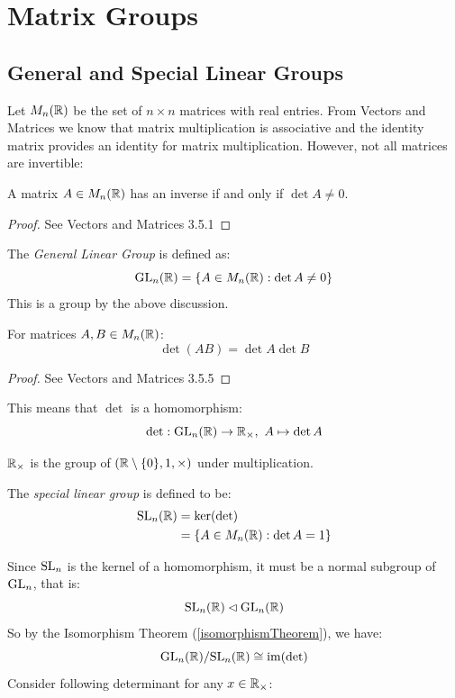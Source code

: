 \documentclass[../main.tex]{subfiles}
\begin{document}
\chapter{Matrix Groups}
\section{General and Special Linear Groups}
Let $M_n(\mathbb{R})$ be the set of $n \times n$ matrices with real entries.
From Vectors and Matrices we know that matrix multiplication is associative and the identity matrix provides an identity for matrix multiplication.
However, not all matrices are invertible:
\begin{lemma}
  A matrix $A \in M_n(\mathbb{R})$ has an inverse if and only if $\det A \neq 0$.
\end{lemma}
\begin{proof}
  See Vectors and Matrices 3.5.1
\end{proof}
\begin{definition}
  The \textit{General Linear Group} is defined as:
  \[
    \mathrm{GL}_n(\mathbb{R}) = \{A \in M_n(\mathbb{R}) : \det A \neq 0\}
  \]
  This is a group by the above discussion.
\end{definition}
\begin{lemma}
  For matrices $A, B \in M_n(\mathbb{R})$:
  \[
    \det(AB) = \det A \det B
  \]
\end{lemma}
\begin{proof}
  See Vectors and Matrices 3.5.5
\end{proof}
This means that $\det$ is a homomorphism:
\[
  \det: \mathrm{GL}_n(\mathbb{R}) \to \mathbb{R}_\times,\ A \mapsto \det A
\]
\begin{remark}[Notation]
  $\mathbb{R}_\times$ is the group of $(\mathbb{R} \setminus \{0\}, 1, \times)$ under multiplication.
\end{remark}
\begin{definition}
  The \textit{special linear group} is defined to be:
  \begin{align*}
    \mathrm{SL}_n(\mathbb{R}) &= \ker(\det) \\
              &= \{A \in M_n(\mathbb{R}) : \det A = 1\}
  \end{align*}
\end{definition}
Since $\mathrm{SL}_n$ is the kernel of a homomorphism, it must be a normal subgroup of $\mathrm{GL}_n$, that is:
\[
  \mathrm{SL}_n(\mathbb{R}) \lhd \mathrm{GL}_n(\mathbb{R})
\]
So by the Isomorphism Theorem (\cref{isomorphismTheorem}), we have:
\[
  \mathrm{GL}_n(\mathbb{R}) / \mathrm{SL}_n(\mathbb{R}) \cong \operatorname{im} (\det)
\]
Consider following determinant for any $x \in \mathbb{R}_\times$:
\end{document}
